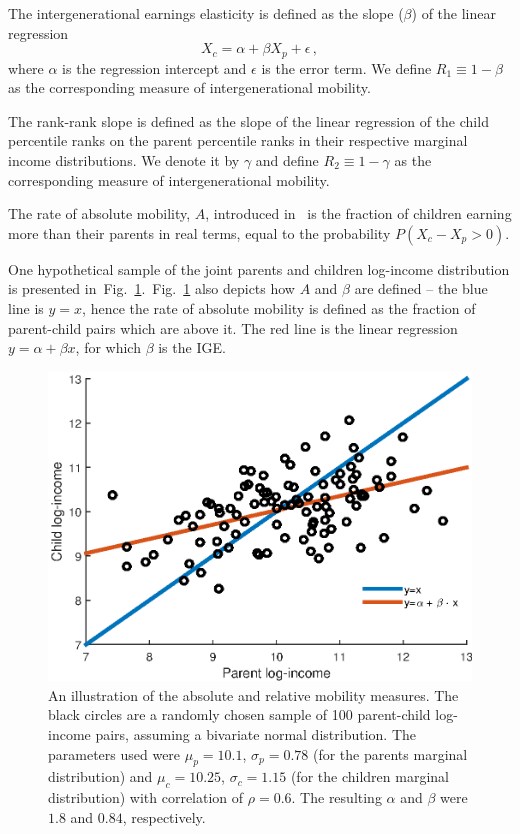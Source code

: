 \documentclass[12pt,a4paper]{article}
\newcommand{\flabel}[1]{\label{fig:#1}}
\newcommand{\fref}[1]{Fig.~\ref{fig:#1}}
\newcommand{\be}{\begin{equation}}
\newcommand{\ee}{\end{equation}}
\numberwithin{equation}{section}
\begin{document}
The intergenerational earnings elasticity is defined as the slope ($\beta$) of the linear regression
\be
X_c = \alpha + \beta X_p + \epsilon\,,
\ee
where $\alpha$ is the regression intercept and $\epsilon$ is the error term. We define $R_1\equiv 1- \beta$ as the corresponding measure of intergenerational mobility.

The rank-rank slope
is defined as the slope of the linear regression of the child percentile ranks on the parent percentile ranks in their respective marginal income distributions. We denote it by $\gamma$ and define $R_2\equiv 1- \gamma$ as the corresponding measure of intergenerational mobility.

The rate of absolute mobility, $A$, introduced in~\citep[p.~1563]{chetty2014land} is the fraction of children earning more than their parents in real terms, equal to the probability $P\left(X_c-X_p > 0\right)$.

One hypothetical sample of the joint parents and children log-income distribution is presented in~\fref{lines}.~\fref{lines} also depicts how $A$ and $\beta$ are defined -- the blue line is $y=x$, hence the rate of absolute mobility is defined as the fraction of parent-child pairs which are above it. The red line is the linear regression $y=\alpha +\beta x$, for which $\beta$ is the IGE.

\begin{figure}[!htb]
\centering
\includegraphics[width=1.0\textwidth]{./figs/bivariate_lines3.eps}
\caption{An illustration of the absolute and relative mobility measures. The black circles are a randomly chosen sample of 100 parent-child log-income pairs, assuming a bivariate normal distribution. The parameters used were $\mu_p=10.1$, $\sigma_p=0.78$ (for the parents marginal distribution) and $\mu_c=10.25$, $\sigma_c=1.15$ (for the children marginal distribution) with correlation of $\rho=0.6$. The resulting $\alpha$ and $\beta$ were $1.8$ and $0.84$, respectively.}
\flabel{lines}
\end{figure}
\end{document}
